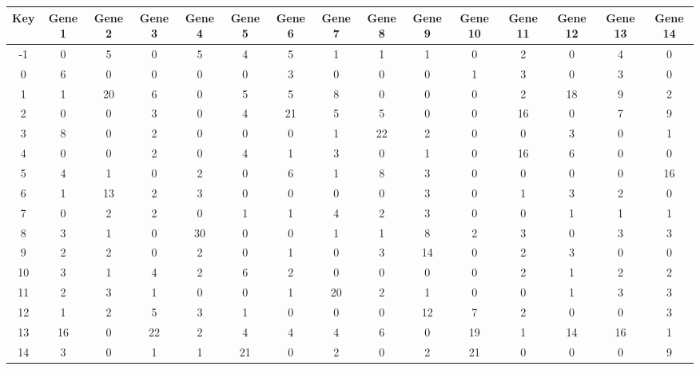 \begin{tabular}{|c|c|c|c|c|c|c|c|c|c|c|c|c|c|c|}
\hline
Key & Gene 1 & Gene 2 & Gene 3 & Gene 4 & Gene 5 & Gene 6 & Gene 7 & Gene 8 & Gene 9 & Gene 10 & Gene 11 & Gene 12 & Gene 13 & Gene 14 \\
\hline
-1 & 0 & 5 & 0 & 5 & 4 & 5 & 1 & 1 & 1 & 0 & 2 & 0 & 4 & 0 \\
0 & 6 & 0 & 0 & 0 & 0 & 3 & 0 & 0 & 0 & 1 & 3 & 0 & 3 & 0 \\
1 & 1 & 20 & 6 & 0 & 5 & 5 & 8 & 0 & 0 & 0 & 2 & 18 & 9 & 2 \\
2 & 0 & 0 & 3 & 0 & 4 & 21 & 5 & 5 & 0 & 0 & 16 & 0 & 7 & 9 \\
3 & 8 & 0 & 2 & 0 & 0 & 0 & 1 & 22 & 2 & 0 & 0 & 3 & 0 & 1 \\
4 & 0 & 0 & 2 & 0 & 4 & 1 & 3 & 0 & 1 & 0 & 16 & 6 & 0 & 0 \\
5 & 4 & 1 & 0 & 2 & 0 & 6 & 1 & 8 & 3 & 0 & 0 & 0 & 0 & 16 \\
6 & 1 & 13 & 2 & 3 & 0 & 0 & 0 & 0 & 3 & 0 & 1 & 3 & 2 & 0 \\
7 & 0 & 2 & 2 & 0 & 1 & 1 & 4 & 2 & 3 & 0 & 0 & 1 & 1 & 1 \\
8 & 3 & 1 & 0 & 30 & 0 & 0 & 1 & 1 & 8 & 2 & 3 & 0 & 3 & 3 \\
9 & 2 & 2 & 0 & 2 & 0 & 1 & 0 & 3 & 14 & 0 & 2 & 3 & 0 & 0 \\
10 & 3 & 1 & 4 & 2 & 6 & 2 & 0 & 0 & 0 & 0 & 2 & 1 & 2 & 2 \\
11 & 2 & 3 & 1 & 0 & 0 & 1 & 20 & 2 & 1 & 0 & 0 & 1 & 3 & 3 \\
12 & 1 & 2 & 5 & 3 & 1 & 0 & 0 & 0 & 12 & 7 & 2 & 0 & 0 & 3 \\
13 & 16 & 0 & 22 & 2 & 4 & 4 & 4 & 6 & 0 & 19 & 1 & 14 & 16 & 1 \\
14 & 3 & 0 & 1 & 1 & 21 & 0 & 2 & 0 & 2 & 21 & 0 & 0 & 0 & 9 \\
\hline
\end{tabular}